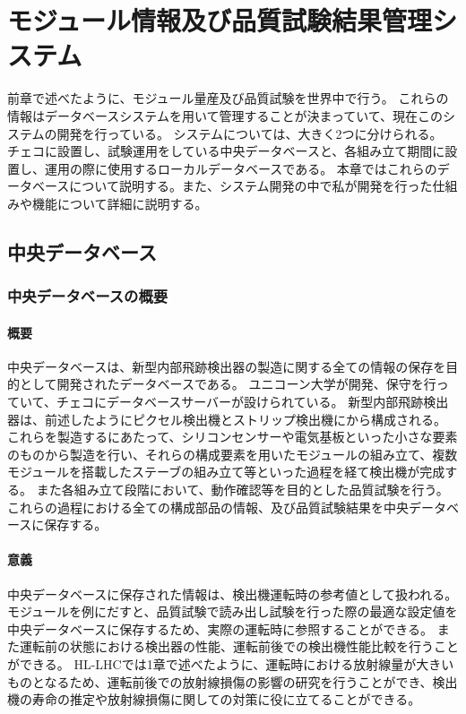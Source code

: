 \chapter{モジュール情報及び品質試験結果管理システム}
前章で述べたように、モジュール量産及び品質試験を世界中で行う。
これらの情報はデータベースシステムを用いて管理することが決まっていて、現在このシステムの開発を行っている。
システムについては、大きく2つに分けられる。
チェコに設置し、試験運用をしている中央データベースと、各組み立て期間に設置し、運用の際に使用するローカルデータベースである。
本章ではこれらのデータベースについて説明する。また、システム開発の中で私が開発を行った仕組みや機能について詳細に説明する。

\section{中央データベース}
\subsection{中央データベースの概要}
\subsubsection{概要}
中央データベースは、新型内部飛跡検出器の製造に関する全ての情報の保存を目的として開発されたデータベースである。
ユニコーン大学が開発、保守を行っていて、チェコにデータベースサーバーが設けられている。
新型内部飛跡検出器は、前述したようにピクセル検出機とストリップ検出機にから構成される。
これらを製造するにあたって、シリコンセンサーや電気基板といった小さな要素のものから製造を行い、それらの構成要素を用いたモジュールの組み立て、複数モジュールを搭載したステーブの組み立て等といった過程を経て検出機が完成する。
また各組み立て段階において、動作確認等を目的とした品質試験を行う。
これらの過程における全ての構成部品の情報、及び品質試験結果を中央データベースに保存する。

\subsubsection{意義}
中央データベースに保存された情報は、検出機運転時の参考値として扱われる。
モジュールを例にだすと、品質試験で読み出し試験を行った際の最適な設定値を中央データベースに保存するため、実際の運転時に参照することができる。
また運転前の状態における検出器の性能、運転前後での検出機性能比較を行うことができる。
HL-LHCでは1章で述べたように、運転時における放射線量が大きいものとなるため、運転前後での放射線損傷の影響の研究を行うことができ、検出機の寿命の推定や放射線損傷に関しての対策に役に立てることができる。

